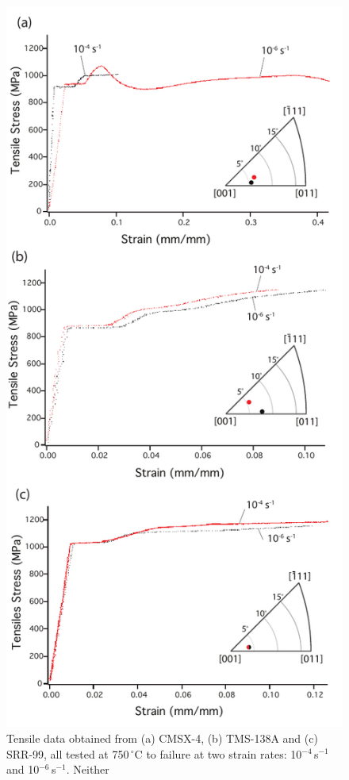 \documentclass[a4paper,12pt,times,numbered,print,index]{Classes/PhDThesisPSnPDF}
\begin{document}
\begin{figure}
\centering
\includegraphics[width=\textwidth,height=\textheight,keepaspectratio]{Figures/Figure2_vert.pdf}
\caption{Tensile data obtained from (a) CMSX-4, (b) TMS-138A and (c) SRR-99, all tested at 750\,$^\circ$C to failure at two strain rates: 10$^{-4}$\,s$^{-1}$ and 10$^{-6}$\,s$^{-1}$. Neither }
\label{fig:138ASRR99_curves}
\end{figure}
\end{document}
